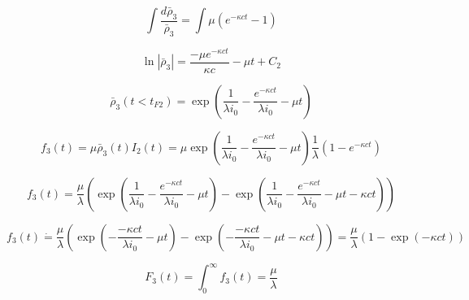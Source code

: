 \documentclass{article}
\begin{document}
$$\int \frac{d{\bar \rho_3}}{\bar \rho_3} = \int \mu ( e^{-\kappa c t} -1)$$

$$\ln|\bar{\rho}_3| = \frac{- \mu e^{-\kappa c t}}{\kappa c} - \mu t + C_2$$

$$\bar \rho_3(t<t_{F2}) = \exp\left( \frac{1}{\lambda i_0} - \frac{e^{-\kappa c t}}{\lambda i_0}-\mu t\right)$$


$$f_3(t) = \mu \bar \rho_3(t)I_2(t) = \mu \exp\left( \frac{1}{\lambda i_0} - \frac{e^{-\kappa c t}}{\lambda i_0}-\mu t\right) \frac{1}{\lambda}\left(1-e^{-\kappa c t}\right)$$

$$f_3(t) = \frac{\mu}{\lambda} \left( \exp\left( \frac{1}{\lambda i_0} - \frac{e^{-\kappa c t}}{\lambda i_0}-\mu t\right) - \exp\left( \frac{1}{\lambda i_0} - \frac{e^{-\kappa c t}}{\lambda i_0}-\mu t - \kappa c t\right) \right)$$

$$f_3(t) \dot{=} \frac{\mu}{\lambda} \left( \exp\left( - \frac{{-\kappa c t}}{\lambda i_0}-\mu t\right) - \exp\left(  - \frac{{-\kappa c t}}{\lambda i_0}-\mu t - \kappa c t\right) \right) 
= \frac{\mu}{\lambda}\left( 1 - \exp\left(- \kappa c t\right)\right)$$

$$F_3(t) = \int_0^\infty f_3(t) = \frac{\mu}{\lambda} $$
\end{document}
